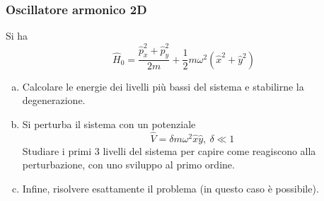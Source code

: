 \documentclass[11pt, a4paper]{scrartcl} %
\numberwithin{equation}{subsection}
\theoremstyle{style2}
\theoremstyle{style1}
\begin{document}
\subsubsection{Oscillatore armonico 2D}

Si ha 
\[
\hat{H}_0 = \frac{\hat{p}_x^2+ \hat{p}_y^2}{2m}+ \frac{1}{2} m\omega^2(\hat{x}^2 + \hat{y}^2)
\] 
\begin{enumerate}[(a).]
	\item Calcolare le energie dei livelli pi\`u bassi del sistema e stabilirne la degenerazione.
	\item Si perturba il sistema con un potenziale
\[
\hat{V} = \delta m\omega^2 \hat{x}\hat{y}, \ \delta \ll 1
\] 
Studiare i primi 3 livelli del sistema per capire come reagiscono alla perturbazione, con uno sviluppo al primo ordine.

\item Infine, risolvere esattamente il problema (in questo caso \`e possibile).
\end{enumerate}
\end{document}
